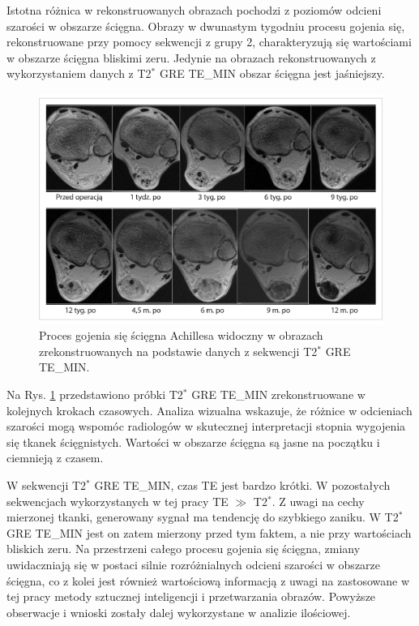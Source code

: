 Istotna różnica w rekonstruowanych obrazach pochodzi z poziomów odcieni szarości w obszarze ścięgna. Obrazy w dwunastym tygodniu procesu gojenia się, rekonstruowane przy pomocy sekwencji z grupy 2, charakteryzują się wartościami w obszarze ścięgna bliskimi zeru. Jedynie na obrazach rekonstruowanych z wykorzystaniem danych z T2$^\ast$ GRE TE\_MIN obszar ścięgna jest jaśniejszy. 


\begin{figure}[h]
	\centering
	\includegraphics[width=1\textwidth]{figures/T2gremin.jpg}
	\caption{Proces gojenia się ścięgna Achillesa widoczny w obrazach zrekonstruowanych na podstawie danych z sekwencji T2$^\ast$ GRE TE\_MIN.}\label{fig:T2comp}
\end{figure}
\newpage
Na Rys. \ref{fig:T2comp} przedstawiono próbki T2$^\ast$ GRE TE\_MIN zrekonstruowane w kolejnych krokach czasowych. Analiza wizualna wskazuje, że różnice w odcieniach szarości mogą wspomóc radiologów w skutecznej interpretacji stopnia wygojenia się tkanek ścięgnistych. Wartości w obszarze ścięgna są jasne na początku i ciemnieją z czasem. 

W sekwencji T2$^\ast$ GRE TE\_MIN, czas TE jest bardzo krótki. W pozostałych sekwencjach wykorzystanych w tej pracy TE $\gg$ T2$^\ast$. Z uwagi na cechy mierzonej tkanki, generowany sygnał ma tendencję do szybkiego zaniku. W T2$^\ast$ GRE TE\_MIN jest on zatem mierzony przed tym faktem, a nie przy wartościach bliskich zeru. \linebreak Na przestrzeni całego procesu gojenia się ścięgna, zmiany uwidaczniają się w postaci silnie rozróżnialnych odcieni szarości w obszarze ścięgna, co z kolei jest również wartościową informacją z uwagi na zastosowane w tej pracy metody sztucznej inteligencji i przetwarzania obrazów. Powyższe obserwacje i wnioski zostały dalej wykorzystane w analizie ilościowej.

